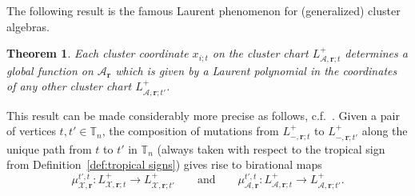 \documentclass{amsart}
\newtheorem{theorem}{Theorem}[section]
\numberwithin{equation}{section}
\newcommand{\bfr}{{\boldsymbol{r}}}
\newcommand{\cA}{\mathcal{A}}
\newcommand{\cX}{\mathcal{X}}
\newcommand{\TT}{\mathbb{T}}
\begin{document}
The following result is the famous Laurent phenomenon for (generalized) cluster algebras.
\begin{theorem}
  \cite{FZ02,GSV16}
  Each cluster coordinate $x_{i;t}$ on the cluster chart $L^+_{\cA,\bfr;t}$ determines a global function on $\cA_\bfr$ which is given by a Laurent polynomial in the coordinates of any other cluster chart $L^+_{\cA,\bfr;t'}$.
\end{theorem}

This result can be made considerably more precise as follows, c.f.\ \cite{FZ07,NR16}.
Given a pair of vertices $t,t'\in\TT_n$, the composition of mutations from $L^+_{-,\bfr;t}$ to $L^+_{-,\bfr;t'}$ along the unique path from $t$ to $t'$ in $\TT_n$ (always taken with respect to the tropical sign from Definition~\ref{def:tropical signs}) gives rise to birational maps
\[\mu_{\cX,\bfr}^{t',t}:L^+_{\cX,\bfr;t}\to L^+_{\cX,\bfr;t'}\qquad\text{and}\qquad\mu_{\cA,\bfr}^{t',t}:L^+_{\cA,\bfr;t}\to L^+_{\cA,\bfr;t'}.\]
\end{document}
